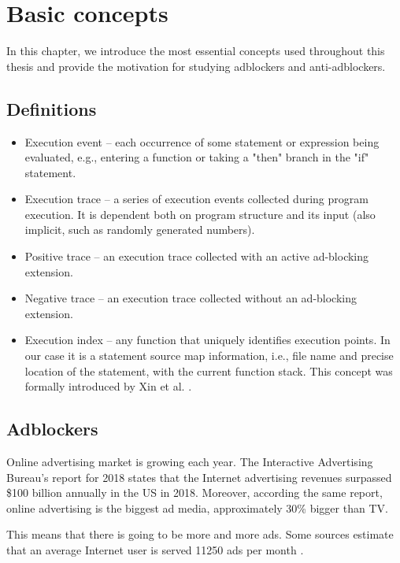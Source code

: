 \chapter{Basic concepts}

In this chapter, we introduce the most essential concepts used throughout this thesis
and provide the motivation for studying adblockers and anti-adblockers.

\section{Definitions}
\label{definitions}

\begin{itemize}
  \item Execution event -- each occurrence of some statement or expression being evaluated, e.g., entering 
        a function or taking a "then" branch in the "if" statement.
  \item Execution trace -- a series of execution events collected during program execution. 
           It is dependent both on program structure and its input (also implicit, such as randomly generated numbers).
  \item Positive trace -- an execution trace collected with an active ad-blocking extension.
  \item Negative trace -- an execution trace collected without an ad-blocking extension.
  \item Execution index -- any function that uniquely identifies execution points. In our case
        it is a statement source map information, i.e., file name and precise location of the statement,
        with the current function stack. This concept was formally introduced by Xin et al. \cite{sigplan:execution-indexing}.
\end{itemize}


\section{Adblockers}

Online advertising market is growing each year. The Interactive Advertising Bureau's report for 2018 \cite{iab:2018-report}
states that the Internet advertising revenues surpassed \$100 billion annually in the US in 2018. Moreover, according the same report,
online advertising is the biggest ad media, approximately 30\% bigger than TV.

This means that there is going to be more and more ads. 
Some sources estimate that an average Internet user is served 11250 ads per month \cite{huff:too-many-ads}.


